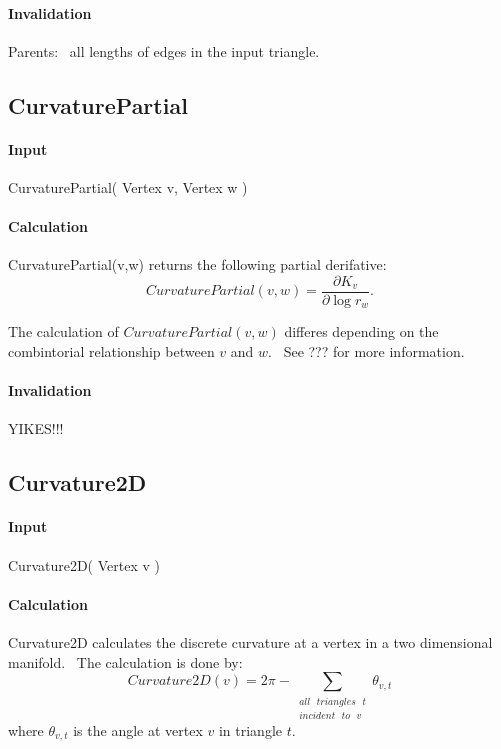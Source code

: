 \paragraph{Invalidation}

Parents: \ all lengths of edges in the input triangle.

\subsection{CurvaturePartial}

\paragraph{Input}

CurvaturePartial( Vertex v, Vertex w )

\paragraph{Calculation}

CurvaturePartial(v,w) returns the following partial derifative:%
\begin{equation*}
CurvaturePartial(v,w)=\frac{\partial K_{v}}{\partial \log r_{w}}.
\end{equation*}

The calculation of $CurvaturePartial(v,w)$ differes depending on the
combintorial relationship between $v$ and $w$. \ See ??? for more
information.

\paragraph{Invalidation}

YIKES!!!

\subsection{Curvature2D}

\paragraph{Input}

Curvature2D( Vertex v )

\paragraph{Calculation}

Curvature2D calculates the discrete curvature at a vertex in a two
dimensional manifold. \ The calculation is done by:%
\begin{equation*}
Curvature2D\left( v\right) =2\pi -\sum\limits_{\substack{ all\text{ }%
triangles\text{ }t  \\ incident\text{ }to\text{ }v}}\theta _{v,t}
\end{equation*}%
where $\theta _{v,t}$ is the angle at vertex $v$ in triangle $t$. \ 

